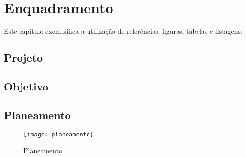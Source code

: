 \chapter{Enquadramento}
\label{cap2}

Este capítulo exemplifica a utilização de referências, figuras, tabelas e listagens.

\section{Projeto}
\section{Objetivo}
\section{Planeamento}

\begin{figure}[!htb]
\centering
\texttt{[image: planeamento]}
\caption{Planeamento}
\label{fig:planeamentoFig}
\end{figure}